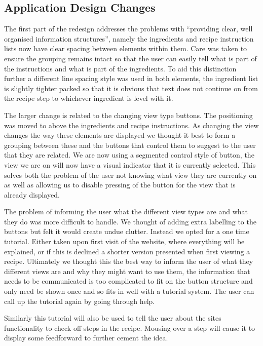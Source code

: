 \subsection{Application Design Changes}
The first part of the redesign addresses the problems with “providing clear, well organised information structures”, namely the ingredients and recipe instruction lists now have clear spacing between elements within them. Care was taken to ensure the grouping remains intact so that the user can easily tell what is part of the instructions and what is part of the ingredients. To aid this distinction further a different line spacing style was used in both elements, the ingredient list is slightly tighter packed so that it is obvious that text does not continue on from the recipe step to whichever ingredient is level with it.

The larger change is related to the changing view type buttons. The positioning was moved to above the ingredients and recipe instructions. As changing the view changes the way these elements are displayed we thought it best to form a grouping between these and the buttons that control them to suggest to the user that they are related. We are now using a segmented control style of button, the view we are on will now have a visual indicator that it is currently selected. This solves both the problem of the user not knowing what view they are currently on as well as allowing us to disable pressing of the button for the view that is already displayed.

The problem of informing the user what the different view types are and what they do was more difficult to handle. We thought of adding extra labelling to the buttons but felt it would create undue clutter. Instead we opted for a one time tutorial. Either taken upon first visit of the website, where everything will be explained, or if this is declined a shorter version presented when first viewing a recipe. Ultimately we thought this the best way to inform the user of what they different views are and why they might want to use them, the information that needs to be communicated is too complicated to fit on the button structure and only need be shown once and so fits in well with a tutorial system. The user can call up the tutorial again by going through help. 

Similarly this tutorial will also be used to tell the user about the sites functionality to check off steps in the recipe. Mousing over a step will cause it to display some feedforward to further cement the idea.
